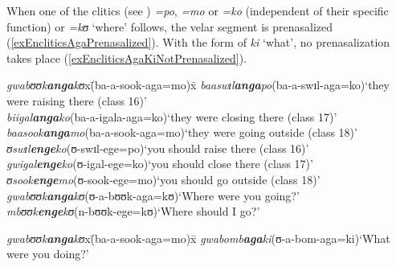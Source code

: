 When one of the clitics (see ) \textit{=po}, \textit{=mo} or \textit{=ko} (independent of their specific function) or \textit{=kʊ} \lq where' follows, the velar segment is prenasalized (\ref{exEncliticsAgaPrenasalized}). With the  form of \textit{ki} `what', no prenasalization takes place (\ref{exEncliticsAgaKiNotPrenasalized}).
\begin{exe}
\ex\label{exEncliticsAgaPrenasalized}
\begin{tabbing}
\textit{gwabʊʊk\textbf{anga}kʊ}x\=(\degree ba-a-sook-aga=mo)x\=\kill
\textit{baaswɪl\textbf{anga}po}\>(\degree ba-a-swɪl-aga=ko)\>`they were raising there (class 16)'\\
\textit{biigal\textbf{anga}ko}\>(\degree ba-a-igala-aga=ko)\>`they were closing there (class 17)'\\
\textit{baasook\textbf{anga}mo}\>(\degree ba-a-sook-aga=mo)\>`they were going outside (class 18)'\\
\textit{ʊswɪl\textbf{enge}ko}\>(\degree ʊ-swɪl-ege=po)\>`you should raise there (class 16)'\\
\textit{gwigal\textbf{enge}ko}\>(\degree ʊ-igal-ege=ko)\>`you should close there (class 17)'\\
\textit{ʊsook\textbf{enge}mo}\>(\degree ʊ-sook-ege=mo)\>`you should go outside (class 18)'\\
\textit{gwabʊʊk\textbf{anga}kʊ}\>(\degree ʊ-a-bʊʊk-aga=kʊ)\>`Where were you going?'\\
\textit{mbʊʊk\textbf{enge}kʊ}\>(\degree n-bʊʊk-ege=kʊ)\>`Where should I go?'
\end{tabbing}
\ex\label{exEncliticsAgaKiNotPrenasalized}\begin{tabbing}
\textit{gwabʊʊk\textbf{anga}kʊ}x\=(\degree ba-a-sook-aga=mo)x\=\kill
\textit{gwabomb\textbf{aga}ki}\>(\degree ʊ-a-bom-aga=ki)\>`What were you doing?'
\end{tabbing}
\end{exe}
